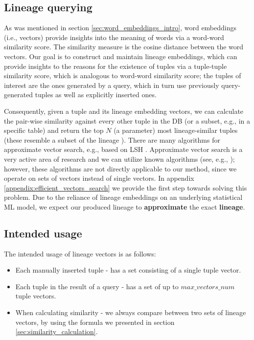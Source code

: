 \subsection{Lineage querying} As was mentioned in section \ref{sec:word_embeddings_intro}, word embeddings (i.e., vectors) provide insights into the meaning of words via a word-word similarity score. The similarity measure is the cosine distance between the word vectors. Our goal is to construct and maintain lineage embeddings, which can provide insights to the reasons for the existence of tuples via a tuple-tuple similarity score, which is analogous to word-word similarity score; the tuples of interest are the ones generated by a query, which in turn use previously query-generated tuples as well as explicitly inserted ones.
\par Consequently, given a tuple and its lineage embedding vectors, we can calculate the pair-wise similarity against every other tuple in the DB (or a subset, e.g., in a specific table) and return the top $N$ (a parameter) most lineage-similar tuples (these resemble a subset of the lineage \cite{Cui:2000:TLV:357775.357777}). 
There are many algorithms for approximate vector search, e.g., based on LSH \cite{lsh}. Approximate vector search is a very active area of research and we can utilize known algorithms (see, e.g., \cite{sugawara-etal-2016-approximately}); however, these algorithms are not directly applicable to our method, since we operate on sets of vectors instead of single vectors. In appendix \ref{appendix:efficient_vectors_search} we provide the first step towards solving this problem.
Due to the reliance of lineage embeddings on an underlying statistical ML model, we expect our produced lineage to \textbf{approximate} the exact \textbf{lineage}.\\


\subsection{Intended usage} The intended usage of lineage vectors is as follows:
\begin{itemize}
    \item Each manually inserted tuple - has a set consisting of a single tuple vector.
    \item Each tuple in the result of a query - has a set of up to $max\_vectors\_num$ tuple vectors.
    \item When calculating similarity - we always compare between two sets of lineage vectors, by using the formula we presented in section \ref{sec:similarity_calculation}.
\end{itemize}
